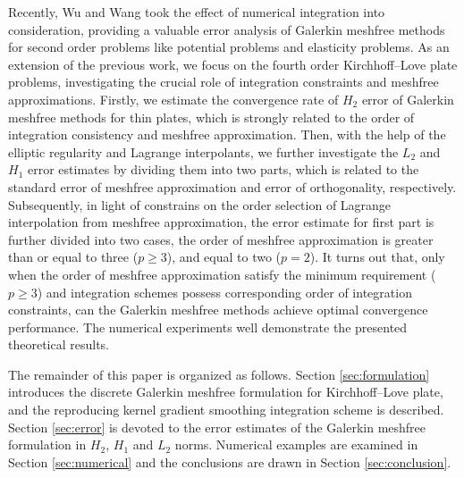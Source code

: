Recently, Wu and Wang \cite{ref50} took the effect of numerical integration into consideration, providing a valuable error analysis of Galerkin meshfree methods for second order problems like potential problems and elasticity problems.
As an extension of the previous work, we focus on the fourth order Kirchhoff--Love plate problems, investigating the crucial role of integration constraints and meshfree approximations.
Firstly, we estimate the convergence rate of $H_2$ error of Galerkin meshfree methods for thin plates, which is strongly related to the order of integration consistency and meshfree approximation.
Then, with the help of the elliptic regularity \cite{ref51} and Lagrange interpolants, we further investigate the $L_2$ and $H_1$ error estimates by dividing them into two parts, which is related to the standard error of meshfree approximation and error of orthogonality, respectively.
Subsequently, in light of constrains on the order selection of Lagrange interpolation from meshfree approximation, the error estimate for first part is further divided into two cases, the order of meshfree approximation is greater than or equal to three ($p\ge3$), and equal to two ($p=2$).
It turns out that, only when the order of meshfree approximation satisfy the minimum requirement ($p\ge3$) and integration schemes possess corresponding order of integration constraints, can the Galerkin meshfree methods achieve optimal convergence performance.
The numerical experiments well demonstrate the presented theoretical results.

The remainder of this paper is organized as follows.
Section \ref{sec:formulation} introduces the discrete Galerkin meshfree formulation for Kirchhoff--Love plate, and the reproducing kernel gradient smoothing integration scheme is described.
Section \ref{sec:error} is devoted to the error estimates of the Galerkin meshfree formulation in $H_2$, $H_1$ and $L_2$ norms.
Numerical examples are examined in Section \ref{sec:numerical} and the conclusions are drawn in Section \ref{sec:conclusion}.
